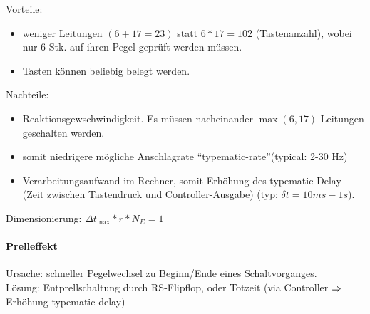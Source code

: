 \documentclass[6pt,a4paper]{scrartcl}
\begin{document}
\begin{multicols*}{4}
{Vorteile:
\begin{itemize}
\setlength{\itemsep}{0pt}
	\item weniger Leitungen $(6+17 =23)$ statt $6*17 = 102$ (Tastenanzahl), wobei nur 6 Stk. auf ihren Pegel geprüft werden müssen. 
	\item Tasten können beliebig belegt werden.
\end{itemize}
Nachteile:
\begin{itemize}
\setlength{\itemsep}{0pt}
	\item Reaktionsgewschwindigkeit. Es müssen nacheinander $\max(6,17)$ Leitungen geschalten werden. 
	\item somit niedrigere mögliche Anschlagrate "`typematic-rate"'(typical: 2-30 Hz)
	\item Verarbeitungsaufwand im Rechner, somit Erhöhung des typematic Delay (Zeit zwischen Tastendruck und Controller-Ausgabe) (typ: $\delta t =  10ms - 1s$). 
\end{itemize}
Dimensionierung: 
$\Delta t_{\max} * r * N_E = 1$

\paragraph{Prelleffekt}
Ursache: schneller Pegelwechsel zu Beginn/Ende eines Schaltvorganges. \\
Lösung: Entprellschaltung durch RS-Flipflop, oder Totzeit (via Controller $\Rightarrow$ Erhöhung typematic delay)
}

\end{multicols*}
\end{document}

